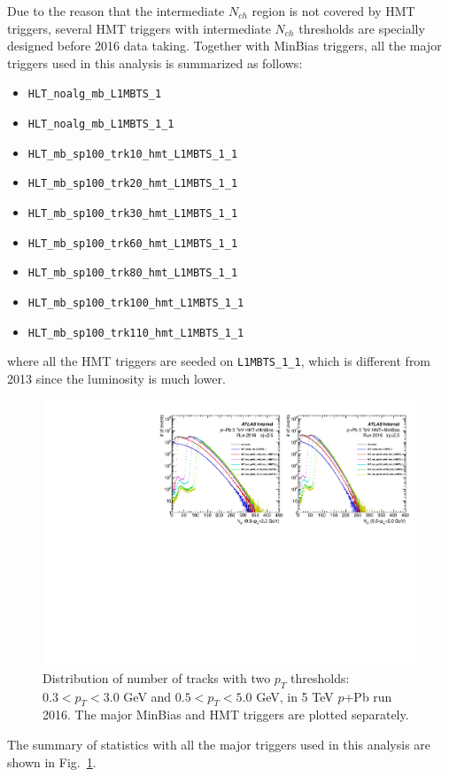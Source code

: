 Due to the reason that the intermediate $N_{ch}$ region is not covered by HMT triggers, several HMT triggers with intermediate $N_{ch}$ thresholds are specially designed before 2016 data taking. Together with MinBias triggers, all the major triggers used in this analysis is summarized as follows:
\begin{itemize}
\item \verb|HLT_noalg_mb_L1MBTS_1|
\item \verb|HLT_noalg_mb_L1MBTS_1_1|
\item \verb|HLT_mb_sp100_trk10_hmt_L1MBTS_1_1|
\item \verb|HLT_mb_sp100_trk20_hmt_L1MBTS_1_1|
\item \verb|HLT_mb_sp100_trk30_hmt_L1MBTS_1_1|
\item \verb|HLT_mb_sp100_trk60_hmt_L1MBTS_1_1|
\item \verb|HLT_mb_sp100_trk80_hmt_L1MBTS_1_1|
\item \verb|HLT_mb_sp100_trk100_hmt_L1MBTS_1_1|
\item \verb|HLT_mb_sp100_trk110_hmt_L1MBTS_1_1|
\end{itemize}
where all the HMT triggers are seeded on \verb|L1MBTS_1_1|, which is different from 2013 since the luminosity is much lower.

\begin{figure}[H]
\centering
\includegraphics[width=.9\linewidth]{figs/sec_evtSlc/trkDis_pPb5_run2.pdf}
\caption{Distribution of number of tracks with two $p_{T}$ thresholds: $0.3<p_{T}<3.0$ GeV and $0.5<p_{T}<5.0$ GeV, in 5 TeV $p$+Pb run 2016. The major MinBias and HMT triggers are plotted separately.}
\label{fig:trkDis_pPb5_run2}
\end{figure}
The summary of statistics with all the major triggers used in this analysis are shown in Fig.~\ref{fig:trkDis_pPb5_run2}.

